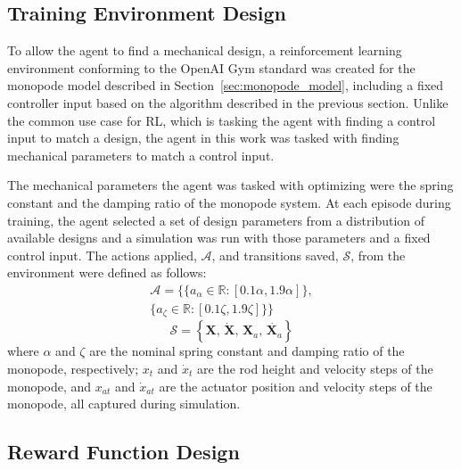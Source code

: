 \documentclass[10pt,twocolumn,letterpaper]{article}
\begin{document}

\subsection{Training Environment Design}
%
To allow the agent to find a mechanical design, a reinforcement learning environment conforming to the OpenAI Gym standard \cite{Brockman2016c} was created for the monopode model described in Section~\ref{sec:monopode_model}, including a fixed controller input based on the algorithm described in the previous section. Unlike the common use case for RL, which is tasking the agent with finding a control input to match a design, the agent in this work was tasked with finding mechanical parameters to match a control input.

The mechanical parameters the agent was tasked with optimizing were the spring constant and the damping ratio of the monopode system. At each episode during training, the agent selected a set of design parameters from a distribution of available designs and a simulation was run with those parameters and a fixed control input. The actions applied, $\mathcal{A}$, and transitions saved, $\mathcal{S}$, from the environment were defined as follows:
%
\begin{equation}
        \label{eq:action}
        \begin{aligned}
        \mathcal{A} = \{ \{ a_{\alpha} \in \mathbb{R}: [0.1 \alpha, 1.9 \alpha] \}, \\ 
        \{ a_{\zeta} \in \mathbb{R}: [0.1 \zeta, 1.9 \zeta] \} \}
        \end{aligned}
\end{equation} 
%
\begin{equation}
        \label{eq:transitions}
        \mathcal{S}= \left \{ \textbf{X}, \, \dot{\textbf{X}}, \, \textbf{X}_a, \, \dot{\textbf{X}_a}  \right \}
\end{equation}
%
where $\alpha$ and $\zeta$ are the nominal spring constant and damping ratio of the monopode, respectively; $x_t$ and $\dot{x}_t$ are the rod height and velocity steps of the monopode, and $x_{at}$ and $\dot{x}_{at}$ are the actuator position and velocity steps of the monopode, all captured during simulation. 

\subsection{Reward Function Design}
\end{document}
